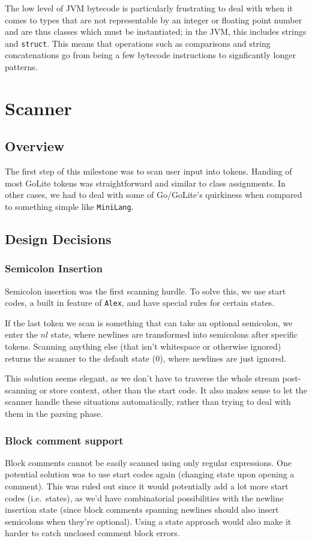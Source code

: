 \documentclass[11pt]{article}
\begin{document}
The low level of JVM bytecode is particularly frustrating to deal with
when it comes to types that are not representable by an integer or
floating point number and are thus classes which must be instantiated;
in the JVM, this includes strings and \texttt{struct}. This means that operations
such as comparisons and string concatenations go from being a few
bytecode instructions to signficantly longer patterns.
\section{Scanner}
\subsection{Overview}
The first step of this milestone was to scan user input into
tokens. Handing of most GoLite tokens was straightforward and similar
to class assignments. In other cases, we had to deal with some of
Go/GoLite's quirkiness when compared to something simple like
\texttt{MiniLang}.

\subsection{Design Decisions}
\subsubsection{Semicolon Insertion}
Semicolon insertion was the first scanning hurdle. To solve this, we
use start codes, a built in feature of \texttt{Alex}, and have special
rules for certain states.

If the last token we scan is something that can take an optional
semicolon, we enter the \(nl\) state, where newlines are transformed
into semicolons after specific tokens. Scanning anything else (that
isn't whitespace or otherwise ignored) returns the scanner to the
default state (\(0\)), where newlines are just ignored.

This solution seems elegant, as we don't have to traverse the whole
stream post-scanning or store context, other than the start code. It
also makes sense to let the scanner handle these situations
automatically, rather than trying to deal with them in the parsing
phase.
\subsubsection{Block comment support}
Block comments cannot be easily scanned using only regular
expressions. One potential solution was to use start codes again
(changing state upon opening a comment). This was ruled out since it
would potentially add a lot more start codes (i.e.\ states), as we'd
have combinatorial possibilities with the newline insertion state
(since block comments spanning newlines should also insert semicolons
when they're optional). Using a state approach would also make it
harder to catch unclosed comment block errors.
\end{document}
